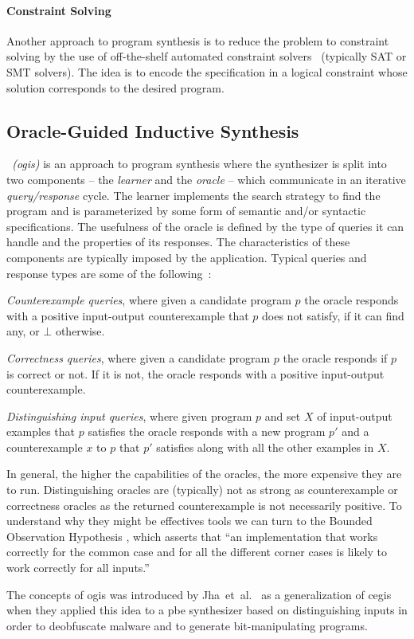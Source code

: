 \paragraph{Constraint Solving}
\label{sec:constraint-solving}

Another approach to program synthesis is to reduce the problem to 
constraint solving by the use of off-the-shelf automated constraint
solvers~\cite{Feng:2018:PSU,Feng:2017:CST,Feng:2017:CSC,Solar-Lezama:2008,Jha:oracle:2010}
(typically SAT or SMT solvers).
The idea is to encode the specification in a logical constraint whose solution
corresponds to the desired program.

\subsection{Oracle-Guided Inductive Synthesis}
\label{sec:ogis}

\textit{~(\Gls{ogis})} is an approach to program synthesis
where the synthesizer is split into two components -- the \textit{learner} and the
\textit{oracle} -- which communicate in an iterative \textit{query/response}
cycle.
The learner implements the search strategy to find the program and is
parameterized by some form of semantic and/or syntactic specifications.
The usefulness of the oracle is defined by the type of queries it can handle and
the properties of its responses. The characteristics of these components are
typically imposed by the application.
Typical queries and response types are some of the following~\cite{Jha:2017:TFS}:
%
\begin{compactitem}
\item \textit{Counterexample queries}, where given a candidate program $p$ the
  oracle responds with a positive input-output counterexample that $p$ does not
  satisfy, if it can find any, or $\bot$ otherwise.
\item \textit{Correctness queries}, where given a candidate program $p$ the
  oracle responds if $p$ is correct or not. If it is not, the oracle responds
  with a positive input-output counterexample.
\item \textit{Distinguishing input queries}, where given program $p$ and set $X$
  of input-output examples that $p$ satisfies the oracle responds with a new
  program $p'$ and a counterexample $x$ to $p$ that $p'$ satisfies along with
  all the other examples in $X$.
\end{compactitem}

In general, the higher the capabilities of the oracles, the more expensive they
are to run. Distinguishing oracles are (typically) not as strong as
counterexample or correctness oracles as the returned counterexample is not
necessarily positive. To understand why they might be effectives tools we can
turn to the Bounded Observation Hypothesis \cite{Solar-Lezama:2008}, which
asserts that ``an implementation that works correctly for the common case and
for all the different corner cases is likely to work correctly for all inputs.''

The concepts of \gls{ogis} was introduced by Jha~et~al.~\cite{Jha:oracle:2010}
as a generalization of \gls{cegis} when they applied this idea to a \gls{pbe}
synthesizer based on distinguishing inputs in order to deobfuscate malware and
to generate bit-manipulating programs.
